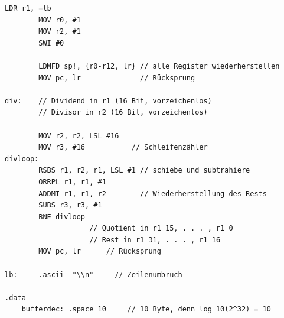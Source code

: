 \documentclass[a4paper, 11pt, onecolumn]{article}
\begin{document}
\begin{lstlisting}[basicstyle=\ttfamily\footnotesize, language={[ARM]Assembler}]
        LDR r1, =lb
        MOV r0, #1
        MOV r2, #1
        SWI #0

        LDMFD sp!, {r0-r12, lr} // alle Register wiederherstellen
        MOV pc, lr              // Rücksprung

div:    // Dividend in r1 (16 Bit, vorzeichenlos)
        // Divisor in r2 (16 Bit, vorzeichenlos)

        MOV r2, r2, LSL #16
        MOV r3, #16           // Schleifenzähler
divloop:
        RSBS r1, r2, r1, LSL #1 // schiebe und subtrahiere
        ORRPL r1, r1, #1
        ADDMI r1, r1, r2        // Wiederherstellung des Rests
        SUBS r3, r3, #1
        BNE divloop
                	// Quotient in r1_15, . . . , r1_0
                	// Rest in r1_31, . . . , r1_16
        MOV pc, lr      // Rücksprung
	
lb:     .ascii  "\\n"     // Zeilenumbruch

.data
	bufferdec: .space 10     // 10 Byte, denn log_10(2^32) = 10
\end{lstlisting}
\end{document}
